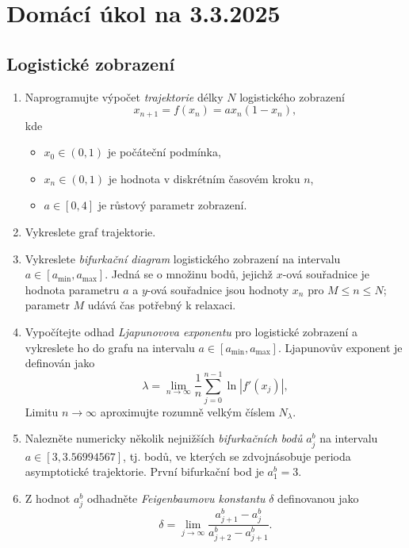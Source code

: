\documentclass[a4paper,11pt,twoside]{article}
\def\abs#1{\left|#1\right|}
\begin{document}
\section*{Domácí úkol na 3.3.2025}
\subsection*{Logistické zobrazení}
\begin{enumerate}
    \item 
        Naprogramujte výpočet \emph{trajektorie} délky $N$ logistického zobrazení
        \begin{equation}
            x_{n+1}=f(x_{n})=ax_{n}(1-x_{n}),
        \end{equation}
        kde 
        \begin{itemize}
            \item $x_{0}\in(0,1)$ je počáteční podmínka,
            \item $x_{n}\in(0,1)$ je hodnota v diskrétním časovém kroku $n$,
            \item $a\in[0,4]$ je růstový parametr zobrazení.
        \end{itemize}
    \item
        Vykreslete graf trajektorie.

    \item 
        Vykreslete \emph{bifurkační diagram} logistického zobrazení na intervalu $a\in[a_{\mathrm{min}},a_{\mathrm{max}}]$.
        Jedná se o množinu bodů, jejichž $x$-ová souřadnice je hodnota parametru $a$ a $y$-ová souřadnice jsou hodnoty $x_{n}$ pro $M\leq n\leq N$; parametr $M$ udává čas potřebný k relaxaci.

    \item
        Vypočítejte odhad \emph{Ljapunovova exponentu} pro logistické zobrazení a vykreslete ho do grafu na intervalu $a\in[a_{\mathrm{min}},a_{\mathrm{max}}]$.
        Ljapunovův exponent je definován jako
        \begin{equation}
            \lambda=\lim_{n\to\infty}\frac{1}{n}\sum_{j=0}^{n-1}\ln\abs{f'(x_{j})},
        \end{equation}
        Limitu $n\rightarrow\infty$ aproximujte rozumně velkým číslem $N_\lambda$.

    \item
        Nalezněte numericky několik nejnižších \emph{bifurkačních bodů} $a^b_{j}$ na intervalu $a\in[3,3.56994567]$, tj. bodů, ve kterých se zdvojnásobuje perioda asymptotické trajektorie.
        První bifurkační bod je $a^b_{1}=3$.

    \item
        Z hodnot $a^b_{j}$ odhadněte \emph{Feigenbaumovu konstantu} $\delta$ definovanou jako
        \begin{equation}
            \delta=\lim_{j\to\infty}\frac{a^b_{j+1}-a^b_{j}}{a^b_{j+2}-a^b_{j+1}}.
        \end{equation}
\end{enumerate}
\end{document}
